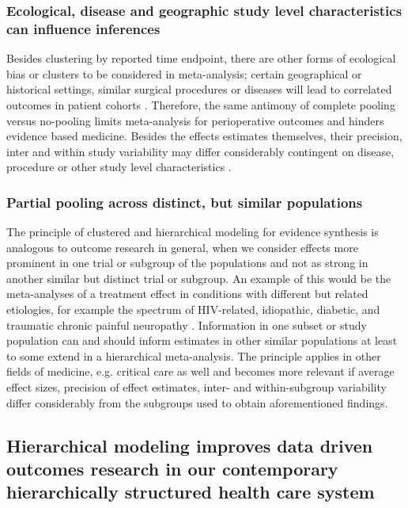 \documentclass[11pt,notitlepage]{article}
\begin{document}
\subsubsection*{Ecological, disease and geographic study level characteristics can influence inferences}
Besides clustering by reported time endpoint, there are other forms of ecological bias or clusters to be considered in meta-analysis; certain geographical or historical settings, similar surgical procedures or diseases will lead to correlated outcomes in patient cohorts \cite{Abroug2011,Andreae2013,Andreae2015,Roth2015CriticalCare}. Therefore, the same antimony of complete pooling versus no-pooling limits meta-analysis for perioperative outcomes and hinders evidence based medicine. Besides the effects estimates themselves, their precision, inter and within study variability may differ considerably contingent on disease, procedure or other study level characteristics \cite{Andreae2013,Andreae2015,Roth2015CriticalCare}.

\subsubsection*{Partial pooling across distinct, but similar populations}
The principle  of clustered and hierarchical modeling for evidence synthesis is analogous to outcome research in general, when we consider effects more prominent in one trial or subgroup of the populations and not as strong in another similar but distinct trial or subgroup. An example of this would be the meta-analyses of a treatment effect in conditions with different but related etiologies, for example the spectrum of HIV-related, idiopathic, diabetic, and traumatic chronic painful neuropathy \cite{Andreae2015}. Information in one subset or study population can and should inform estimates in other similar populations at least to some extend in a hierarchical meta-analysis. The principle applies in other fields of medicine, e.g. critical care as well \cite{Roth2015CriticalCare} and becomes more relevant if average effect sizes, precision of effect estimates, inter- and within-subgroup variability differ considerably from the subgroups used to obtain aforementioned findings.

\subsection*{Hierarchical modeling improves data driven outcomes research in our contemporary hierarchically structured health care system}
 
\end{document}
